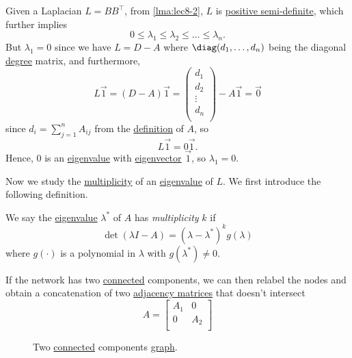 \begin{remark}\label{rmk:property-of-Laplacian}
	Given a Laplacian \(L = B B^{\top}\), from \autoref{lma:lec8-2}, \(L\) is \hyperref[def:positive-semi-definite]{positive semi-definite}, which further implies
	\[
		0 \leq \lambda_1 \leq \lambda_2 \leq \dots \leq \lambda_n.
	\]
	But \(\lambda_1 = 0\) since we have \(L = D-A\) where \(\diag(d_1, \dots , d_n)\) being the diagonal \hyperref[def:degree]{degree} matrix, and furthermore,
	\[
		L \vec{1} = (D - A)\vec{1} = \begin{pmatrix}
			d_1    \\
			d_2    \\
			\vdots \\
			d_n    \\
		\end{pmatrix} - A\vec{1} = \vec{0}
	\]
	since \(d_{i} = \sum_{j=1}^{n} A_{ij}\) from the \hyperref[def:adjacency-matrix]{definition} of \(A\), so
	\[
		L \vec{1} = 0 \vec{1}.
	\]
	Hence, \(0\) is an \hyperref[def:eigenvalue]{eigenvalue} with \hyperref[def:eigenvector]{eigenvector} \(\vec{1}\), so \(\lambda _1=0\).
\end{remark}

Now we study the \hyperref[def:multiplicity]{multiplicity} of an \hyperref[def:eigenvalue]{eigenvalue} of \(L\). We first introduce the following definition.
\begin{definition}[Multiplicity]\label{def:multiplicity}
	We say the \hyperref[def:eigenvalue]{eigenvalue} \(\lambda ^{\ast} \) of \(A\) has \emph{multiplicity} \(k\) if
	\[
		\det(\lambda I - A) = (\lambda - \lambda ^{\ast} )^k g(\lambda )
	\]
	where \(g(\cdot)\) is a polynomial in \(\lambda\) with \(g(\lambda ^{\ast} )\neq 0\).
\end{definition}

If the network has two \hyperref[def:connected]{connected} components, we can then relabel the nodes and obtain a concatenation of two \hyperref[def:adjacency-matrix]{adjacency matrices} that doesn't intersect
\[
	A = \begin{bmatrix}
		A_1 & 0   \\
		0   & A_2 \\
	\end{bmatrix}
\]
\begin{figure}[H]
	\centering
	\caption{Two \hyperref[def:connected]{connected} components \hyperref[def:graph]{graph}.}
	\label{fig:two-component-graph}
\end{figure}

